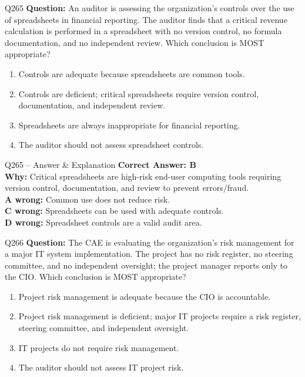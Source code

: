 \documentclass[aspectratio=169,10pt]{beamer}
\begin{document}
	\begin{frame}[t]{Q265}
		\small
		\textbf{Question:} An auditor is assessing the organization's controls over the use of spreadsheets in financial reporting. The auditor finds that a critical revenue calculation is performed in a spreadsheet with no version control, no formula documentation, and no independent review. Which conclusion is MOST appropriate?
		\begin{enumerate}[label=\Alph*.,itemsep=1pt,topsep=2pt]
			\item Controls are adequate because spreadsheets are common tools.
			\item Controls are deficient; critical spreadsheets require version control, documentation, and independent review.
			\item Spreadsheets are always inappropriate for financial reporting.
			\item The auditor should not assess spreadsheet controls.
		\end{enumerate}
	\end{frame}
	
	\begin{frame}[t]{Q265 -- Answer \& Explanation}
		\small
		\textbf{Correct Answer: B} \\[4pt]
		\textbf{Why:} Critical spreadsheets are high-risk end-user computing tools requiring version control, documentation, and review to prevent errors/fraud. \\[4pt]
		\textbf{A wrong:} Common use does not reduce risk. \\[2pt]
		\textbf{C wrong:} Spreadsheets can be used with adequate controls. \\[2pt]
		\textbf{D wrong:} Spreadsheet controls are a valid audit area.
	\end{frame}
	
	\begin{frame}[t]{Q266}
		\small
		\textbf{Question:} The CAE is evaluating the organization's risk management for a major IT system implementation. The project has no risk register, no steering committee, and no independent oversight; the project manager reports only to the CIO. Which conclusion is MOST appropriate?
		\begin{enumerate}[label=\Alph*.,itemsep=1pt,topsep=2pt]
			\item Project risk management is adequate because the CIO is accountable.
			\item Project risk management is deficient; major IT projects require a risk register, steering committee, and independent oversight.
			\item IT projects do not require risk management.
			\item The auditor should not assess IT project risk.
		\end{enumerate}
	\end{frame}
	
\end{document}
